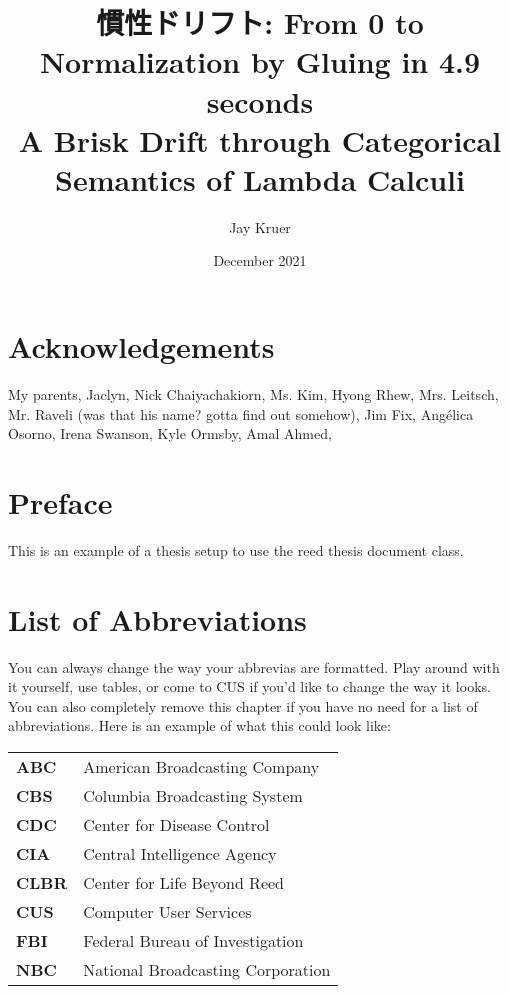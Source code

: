 \documentclass[12pt,twoside]{reedthesis}
\title{慣性ドリフト: From 0 to Normalization by Gluing in 4.9 seconds\\ A Brisk Drift through Categorical Semantics of Lambda Calculi}
\author{Jay Kruer}
\date{December 2021}
\theoremstyle{definition}
\theoremstyle{remark}
\theoremstyle{theorem}
\begin{document}
\maketitle
\frontmatter %
\pagestyle{empty} %

\chapter*{Acknowledgements}
My parents, Jaclyn, Nick Chaiyachakiorn, Ms. Kim, Hyong Rhew, Mrs. Leitsch, Mr. Raveli (was that his name? gotta find out
somehow), Jim Fix, Ang\'elica Osorno, Irena Swanson, Kyle Ormsby, Amal Ahmed,

\chapter*{Preface}
This is an example of a thesis setup to use the reed thesis document class.



\chapter*{List of Abbreviations}
You can always change the way your abbrevias are formatted. Play around with it yourself, use tables, or come to CUS if you'd like to change the way it looks. You can also completely remove this chapter if you have no need for a list of abbreviations. Here is an example of what this could look like:

\begin{table}[h]
  \centering %
  \begin{tabular}{ll}
    \textbf{ABC}  	&  American Broadcasting Company \\
    \textbf{CBS}  	&  Columbia Broadcasting System\\
    \textbf{CDC}  	&  Center for Disease Control \\
    \textbf{CIA}  	&  Central Intelligence Agency\\
    \textbf{CLBR} 	&  Center for Life Beyond Reed\\
    \textbf{CUS}  	&  Computer User Services\\
    \textbf{FBI}  	&  Federal Bureau of Investigation\\
    \textbf{NBC}  	&  National Broadcasting Corporation\\
  \end{tabular}
\end{table}
\end{document}
